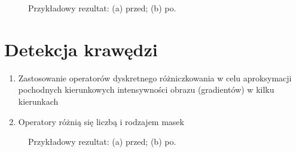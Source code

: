 \documentclass[a4paper,twocolumn,12pt]{article}
\begin{document}
\begin{figure}[!ht]
 \begin{center}
 \end{center}
 \caption{
  Przykładowy rezultat:
  (a) przed;
  (b) po.
 }
 \label{fig:gauss_example}
\end{figure}



\section{Detekcja krawędzi}

\begin{enumerate}
 \item Zastosowanie operatorów dyskretnego różniczkowania w celu aproksymacji pochodnych kierunkowych intensywności obrazu (gradientów) w kilku kierunkach
 \item Operatory różnią się liczbą i rodzajem masek
\end{enumerate}

\begin{figure}[!ht]
 \begin{center}
 \end{center}
 \caption{
  Przykładowy rezultat:
  (a) przed;
  (b) po.
 }
 \label{fig:edges_example}
\end{figure}
\end{document}
